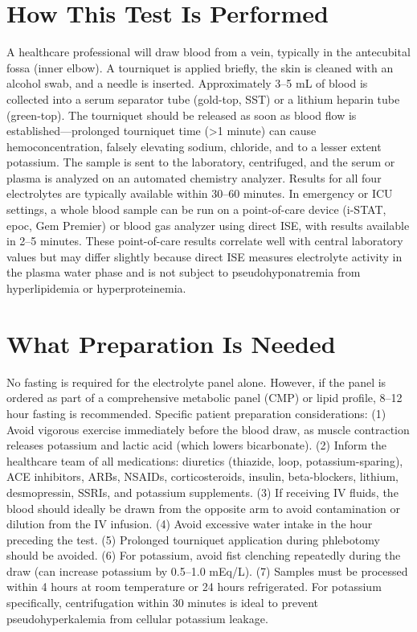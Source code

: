 \section*{How This Test Is Performed}
A healthcare professional will draw blood from a vein, typically in the antecubital fossa (inner elbow). A tourniquet is applied briefly, the skin is cleaned with an alcohol swab, and a needle is inserted. Approximately 3--5 mL of blood is collected into a serum separator tube (gold-top, SST) or a lithium heparin tube (green-top). The tourniquet should be released as soon as blood flow is established---prolonged tourniquet time (>1 minute) can cause hemoconcentration, falsely elevating sodium, chloride, and to a lesser extent potassium. The sample is sent to the laboratory, centrifuged, and the serum or plasma is analyzed on an automated chemistry analyzer. Results for all four electrolytes are typically available within 30--60 minutes. In emergency or ICU settings, a whole blood sample can be run on a point-of-care device (i-STAT, epoc, Gem Premier) or blood gas analyzer using direct ISE, with results available in 2--5 minutes. These point-of-care results correlate well with central laboratory values but may differ slightly because direct ISE measures electrolyte activity in the plasma water phase and is not subject to pseudohyponatremia from hyperlipidemia or hyperproteinemia.

\section*{What Preparation Is Needed}
No fasting is required for the electrolyte panel alone. However, if the panel is ordered as part of a comprehensive metabolic panel (CMP) or lipid profile, 8--12 hour fasting is recommended. Specific patient preparation considerations: (1) Avoid vigorous exercise immediately before the blood draw, as muscle contraction releases potassium and lactic acid (which lowers bicarbonate). (2) Inform the healthcare team of all medications: diuretics (thiazide, loop, potassium-sparing), ACE inhibitors, ARBs, NSAIDs, corticosteroids, insulin, beta-blockers, lithium, desmopressin, SSRIs, and potassium supplements. (3) If receiving IV fluids, the blood should ideally be drawn from the opposite arm to avoid contamination or dilution from the IV infusion. (4) Avoid excessive water intake in the hour preceding the test. (5) Prolonged tourniquet application during phlebotomy should be avoided. (6) For potassium, avoid fist clenching repeatedly during the draw (can increase potassium by 0.5--1.0 mEq/L). (7) Samples must be processed within 4 hours at room temperature or 24 hours refrigerated. For potassium specifically, centrifugation within 30 minutes is ideal to prevent pseudohyperkalemia from cellular potassium leakage.

